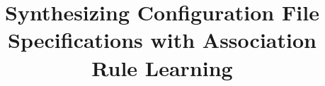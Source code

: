 \documentclass{llncs}
\begin{document}
\setlength{\pdfpageheight}{\paperheight}
\setlength{\pdfpagewidth}{\paperwidth}





\title{Synthesizing Configuration File Specifications with Association Rule Learning}

\author{\xspace}
\institute{\xspace}

\maketitle
\vspace{-45pt}




 









\end{document}
